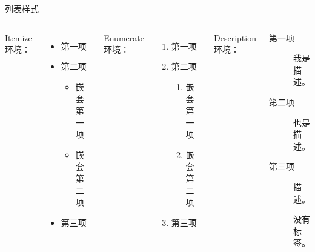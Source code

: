 \documentclass[aspectratio=169]{ctexbeamer}
\begin{document}
\begin{frame}{列表样式}
  \begin{columns}
    Itemize 环境：
    \begin{itemize}
      \item 第一项
      \item 第二项
      \begin{itemize}
        \item 嵌套第一项
        \item 嵌套第二项
      \end{itemize}
      \item 第三项
    \end{itemize}

    Enumerate 环境：
    \begin{enumerate}
      \item 第一项
      \item 第二项
      \begin{enumerate}
        \item 嵌套第一项
        \item 嵌套第二项
      \end{enumerate}
      \item 第三项
    \end{enumerate}

    Description 环境：
    \begin{description}
      \item[第一项] 我是描述。
      \item[第二项] 也是描述。
      \item[第三项] 描述。
      \item[] 没有标签。
    \end{description}
  \end{columns}
\end{frame}
\end{document}
